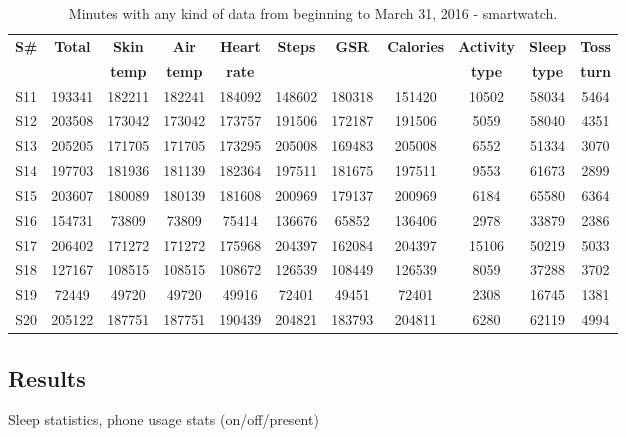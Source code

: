 \documentclass[12pt]{article} %
\begin{document}
\begin{table}[H]
\center
\begin{footnotesize}
	\begin{tabular}{| c | c | c | c | c | c | c | c | c | c | c |}
	\hline
	\textbf{S\#} & \textbf{Total} & \textbf{Skin} & \textbf{Air} & \textbf{Heart} & \textbf{Steps} & \textbf{GSR} & \textbf{Calories} & \textbf{Activity} & \textbf{Sleep} & \textbf{Toss}\\
	 & & \textbf{temp} & \textbf{temp} & \textbf{rate} & & & & \textbf{type} & \textbf{type} & \textbf{turn}\\
	
	\hline
	S11 & 193341 & 182211 & 182241 & 184092 & 148602 & 180318 & 151420 & 10502 & 58034 & 5464\\
	\hline
	S12 & 203508 & 173042 & 173042 & 173757 & 191506 & 172187 & 191506 & 5059 & 58040 & 4351 \\
	\hline
	S13 & 205205 & 171705 & 171705 & 173295 & 205008 & 169483 & 205008 & 6552 & 51334 & 3070\\
	\hline
	S14 & 197703 & 181936 & 181139 & 182364 & 197511 & 181675 & 197511 & 9553 & 61673 & 2899 \\
	\hline
	S15 & 203607 & 180089 & 180139 & 181608 & 200969 & 179137 & 200969 & 6184 & 65580 & 6364 \\
	\hline
	S16 & 154731 & 73809 & 73809 & 75414 &136676 & 65852 & 136406 & 2978 & 33879 & 2386\\
	\hline
	S17 & 206402 & 171272 & 171272 & 175968 & 204397 & 162084 & 204397 & 15106 & 50219 & 5033\\
	\hline
	S18 & 127167 & 108515 &108515 & 108672 & 126539 & 108449 & 126539 & 8059 & 37288 & 3702 \\
	\hline
	S19 & 72449 & 49720 & 49720 & 49916 & 72401 & 49451 & 72401 & 2308 & 16745 & 1381 \\
	\hline
	S20 & 205122 & 187751 & 187751 & 190439 & 204821 & 183793 & 204811 & 6280 & 62119 & 4994\\
	\hline
	\end{tabular}
	\caption{Minutes with any kind of data from beginning to March 31, 2016 - smartwatch.}
	\label{tab:totalMinutesWatch}
\end{footnotesize}
\end{table}




\subsection{Results}
Sleep statistics, phone usage stats (on/off/present)\\
\end{document}
